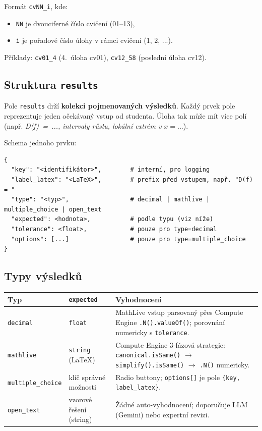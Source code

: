 \documentclass[11pt,a4paper]{article}
\begin{document}
Formát \texttt{cvNN\_i}, kde:
\begin{itemize}
  \item \texttt{NN} je dvouciferné číslo cvičení (01--13),
  \item \texttt{i} je pořadové číslo úlohy v rámci cvičení (1, 2, ...).
\end{itemize}

Příklady: \texttt{cv01\_4} (4.\ úloha cv01), \texttt{cv12\_58} (poslední úloha cv12).

\subsection{Struktura \texttt{results}}\label{sec:results}

Pole \texttt{results} drží \textbf{kolekci pojmenovaných výsledků}. Každý prvek pole reprezentuje jeden očekávaný vstup od studenta. Úloha tak může mít více polí (např. \emph{D(f)~=~..., intervaly růstu, lokální extrém v $x = ...$}).

Schema jednoho prvku:

\begin{lstlisting}[style=json]
{
  "key": "<identifikátor>",        # interní, pro logging
  "label_latex": "<LaTeX>",        # prefix před vstupem, např. "D(f) = "
  "type": "<typ>",                 # decimal | mathlive | multiple_choice | open_text
  "expected": <hodnota>,           # podle typu (viz níže)
  "tolerance": <float>,            # pouze pro type=decimal
  "options": [...]                 # pouze pro type=multiple_choice
}
\end{lstlisting}

\subsection{Typy výsledků}

\begin{longtable}{p{2.5cm}p{4cm}p{8cm}}
  \toprule
  \textbf{Typ} & \textbf{\texttt{expected}} & \textbf{Vyhodnocení} \\
  \midrule
  \texttt{decimal} & \texttt{float} & MathLive vstup parsovaný přes Compute Engine \texttt{.N().valueOf()}; porovnání numericky s \texttt{tolerance}. \\
  \texttt{mathlive} & \texttt{string} (LaTeX) & Compute Engine 3-fázová strategie: \texttt{canonical.isSame()} $\to$ \texttt{simplify().isSame()} $\to$ \texttt{.N()} numericky. \\
  \texttt{multiple\_choice} & klíč správné možnosti & Radio buttony; \texttt{options[]} je pole \texttt{\{key, label\_latex\}}. \\
  \texttt{open\_text} & vzorové řešení (string) & Žádné auto-vyhodnocení; doporučuje LLM (Gemini) nebo expertní revizi. \\
  \bottomrule
\end{longtable}
\end{document}
